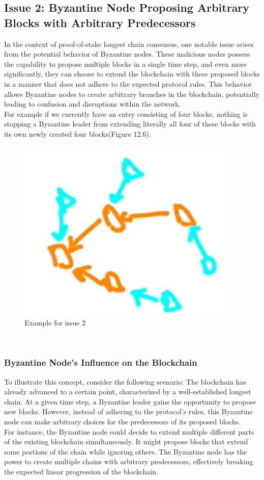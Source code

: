 \subsection{Issue 2: Byzantine Node Proposing Arbitrary Blocks with Arbitrary Predecessors}
In the context of proof-of-stake longest chain consensus, one notable issue arises from the potential behavior of Byzantine nodes. These malicious nodes possess the capability to propose multiple blocks in a single time step, and even more significantly, they can choose to extend the blockchain with these proposed blocks in a manner that does not adhere to the expected protocol rules. This behavior allows Byzantine nodes to create arbitrary branches in the blockchain, potentially leading to confusion and disruptions within the network.\\
For example if we currently have an
entry consisting of four blocks, nothing is stopping a Byzantine leader
from extending literally all four of these blocks with its own newly created four blocks(Figure 12.6).
\begin{figure}[h]
    \centering
    \includegraphics[scale = 0.5]{figures/f55.png}
    \caption{Example for issue 2}
    \label{fig:mesh1}
\end{figure}\\

\subsubsection{Byzantine Node's Influence on the Blockchain}
To illustrate this concept, consider the following scenario: The blockchain has already advanced to a certain point, characterized by a well-established longest chain. At a given time step, a Byzantine leader gains the opportunity to propose new blocks. However, instead of adhering to the protocol's rules, this Byzantine node can make arbitrary choices for the predecessors of its proposed blocks.\\
For instance, the Byzantine node could decide to extend multiple different parts of the existing blockchain simultaneously. It might propose blocks that extend some portions of the chain while ignoring others. The Byzantine node has the power to create multiple chains with arbitrary predecessors, effectively breaking the expected linear progression of the blockchain.\\


